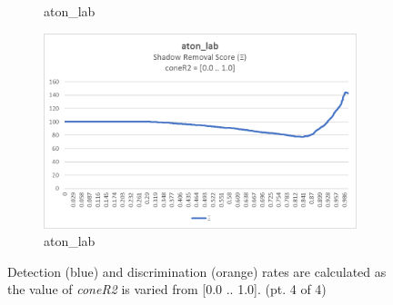 \begin{appendices}
\begin{figure}
\begin{subfigure}{.45\linewidth}
  \caption{aton\_lab}
\end{subfigure}
\hfill
\begin{subfigure}{.45\linewidth}
  \includegraphics[width=1\linewidth]{figures/appendix/lab_coneR2_score.jpg}
  \caption{aton\_lab}
\end{subfigure}
\caption{Detection (blue) and discrimination (orange) rates are calculated as the value of \textit{coneR2} is varied from [0.0 .. 1.0]. (pt. 4 of 4)}

\end{figure}

\clearpage
\FloatBarrier
\begin{figure}


\end{figure}
\end{appendices}
